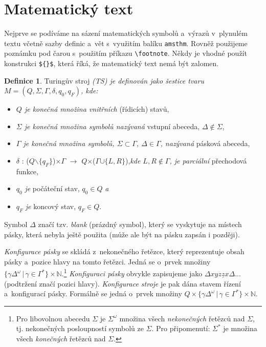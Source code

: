 \documentclass[a4paper, 11pt, twocolumn]{article}
\theoremstyle{definition}
\newtheorem{definition}{Definice}
\theoremstyle{definition}
\begin{document}
\section{Matematický text}
Nejprve se podíváme na sázení matematických symbolů a~výrazů v~plynulém textu včetně sazby definic a~vět s~využitím balíku \texttt{amsthm}. Rovněž použijeme poznámku pod čarou s~použitím příkazu \verb|\footnote|. Někdy je vhodné použít konstrukci \verb|${}$|, která říká, že matematický text nemá být zalomen.
\begin{definition}\label{1}
 Turingův stroj \emph{(TS) je definován jako šestice
tvaru $M = (Q, \Sigma, \Gamma, \delta, q_{0}, q_{F})$, kde:}

\begin{itemize}
    \item \emph{$Q$ je konečná množina vnitřních} (řídicích) stavů,
    \item \emph{$\Sigma$ je konečná množina symbolů nazývaná} vstupní
abeceda, $\Delta \notin \Sigma$,
    \item \emph{$\Gamma$ je konečná množina symbolů, $\Sigma \subset \Gamma$, $\Delta \in \Gamma$,
nazývaná} pásková abeceda,
    \item $\delta$ : ($Q$$\backslash$$\{$$q_{F}$$\}$)$\times$$\Gamma$ $\rightarrow$ $Q$$\times$($\Gamma$$\cup$$\{L, R\}$),\emph{kde $L, R \notin \Gamma$,
je parciální} přechodová funkce,
    \item $q_{0}$ \emph{je} počáteční stav, $q_{0} \in Q$ \emph{a}
    \item $q_{F}$ \emph{je} koncový stav, $q_{F} \in Q$.
\end{itemize}
\end{definition}
Symbol $\Delta$ značí tzv. \emph{blank} (prázdný symbol), který se vyskytuje na místech pásky, která nebyla ještě použita (může ale být na pásku zapsán i později).

\emph{Konfigurace pásky} se skládá z~nekonečného řetězce,
který reprezentuje obsah pásky a~pozice hlavy na tomto
řetězci. Jedná se o~prvek množiny $\{\gamma\Delta^\omega\,|\, \gamma \in \Gamma^*\} \times \mathbb{N}.$\footnote{Pro libovolnou abecedu $\Sigma$ je $\Sigma^\omega$ množina všech \emph{nekonečných} řetězců nad $\Sigma$, tj. nekonečných posloupností symbolů ze $\Sigma$. Pro připomenutí: $\Sigma^*$ je množina všech \emph{konečných} řetězců nad $\Sigma$.} \emph{Konfiguraci pásky} obvykle zapisujeme jako $\Delta xyz\underline{z}x\Delta$... (podtržení značí pozici hlavy). \emph{Konfigurace stroje} je pak dána stavem řízení a~konfigurací pásky. Formálně se jedná o~prvek množiny $Q \times \{\gamma\Delta^\omega\,|\,\gamma \in \Gamma^*\} \times \mathbb{N}$. \label{page1}
\end{document}

